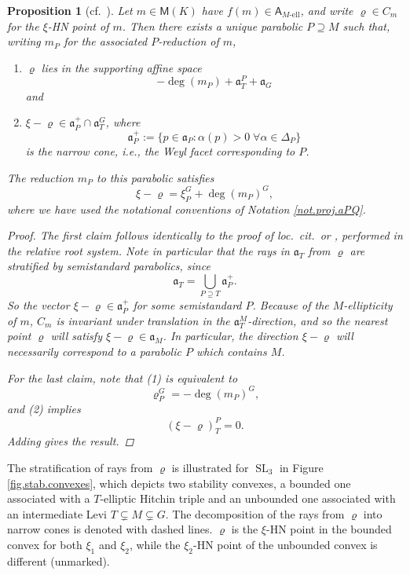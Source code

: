 \documentclass[openany]{amsbook}
\newtheorem{proposition}[theorem]{Proposition}
\theoremstyle{definition}
\theoremstyle{remark}
\numberwithin{equation}{section}
\renewcommand{\-}{\operatorname{-}}
\newcommand{\SL}{\operatorname{SL}}
\renewcommand{\a}{\mathfrak{a}}
\newcommand{\el}{\text{-ell}}
\newcommand{\bM}{\mathsf{M}}
\newcommand{\bA}{\mathsf{A}}
\newcommand{\bAe}[1]{\bA_{#1\el}}
\newcommand{\narcone}{\a^+}
\begin{document}
\begin{proposition}[{{cf.\ \cite[Prop. 6.3.2]{CLI}}}]\label{prop.can.parab}
    Let $m \in \bM(K)$ have $f(m) \in \bAe{M}$, and write $\varrho \in C_m$ for the $\xi$-HN point of $m$. Then there exists a unique parabolic $P \supseteq M$ such that, writing $m_P$ for the associated $P$-reduction of $m$,
    \begin{enumerate}
        \item $\varrho$ lies in the supporting affine space
        $$
            -\deg(m_P) + {\a_T^P} + \a_G
        $$
        and
        \item $\xi - \varrho \in {\narcone_P} \cap \a_T^G$, where
        $$
            {\narcone_P} := \{p \in \a_P : \alpha(p) > 0 \; \forall \alpha \in \Delta_P\}
        $$
        is the narrow cone, i.e., the Weyl facet corresponding to $P$.
    \end{enumerate}
    The reduction $m_P$ to this parabolic satisfies
    \begin{equation}
        \xi - \varrho = \xi_P^G + \deg(m_P)^G,\label{eqn.xi.dist.canonical}
    \end{equation}
    where we have used the notational conventions of Notation \ref{not.proj.aPQ}.
\begin{proof}
    The first claim follows identically to the proof of \emph{loc.\ cit.}\ or \cite[Lemma 5.3.12]{behrendthesis}, performed in the relative root system. Note in particular that the rays in $\a_T$ from $\varrho$ are stratified by semistandard parabolics, since
    $$
        \a_T = \bigcup_{P \supseteq T} {\narcone_P}.
    $$
    So the vector $\xi - \varrho \in {\narcone_P}$ for some semistandard $P$. Because of the $M$-ellipticity of $m$, $C_m$ is invariant under translation in the ${\a_T^M}$-direction, and so the nearest point $\varrho$ will satisfy $\xi - \varrho \in \a_M$. In particular, the direction $\xi - \varrho$ will necessarily correspond to a parabolic $P$ which contains $M$.

    For the last claim, note that (1) is equivalent to 
    $$
        \varrho_P^G = - \deg(m_P)^G,
    $$
    and (2) implies
    $$
        (\xi - \varrho)_T^P = 0.
    $$
    Adding gives the result.
\end{proof}
\end{proposition}

The stratification of rays from $\varrho$ is illustrated for $\SL_3$ in Figure \ref{fig.stab.convexes}, which depicts two stability convexes, a bounded one associated with a $T$-elliptic Hitchin triple and an unbounded one associated with an intermediate Levi $T \subsetneq M \subsetneq G$. The decomposition of the rays from $\varrho$ into narrow cones is denoted with dashed lines. $\varrho$ is the $\xi$-HN point in the bounded convex for both $\xi_1$ and $\xi_2$, while the $\xi_2$-HN point of the unbounded convex is different (unmarked). 
\end{document}
